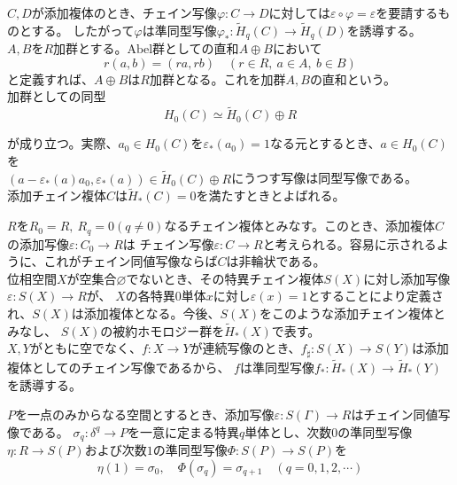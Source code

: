 \documentclass[dvipdfmx,a4paper,11pt]{jsarticle}
\begin{document}
$C,D$が添加複体のとき、チェイン写像$\varphi : C\to D$に対しては$\varepsilon \circ \varphi = \varepsilon$を要請するものとする。
したがって$\varphi$は準同型写像$\varphi_{*} : \widetilde{H}_{q}(C)\to \widetilde{H}_{q}(D)$を誘導する。\\
$A,B$を$R$加群とする。$\mathrm{Abel}$群としての直和$A\oplus B$において
\begin{equation*}
  r(a,b)=(ra,rb)\quad (r\in R,\ a\in A,\ b\in B)
\end{equation*}
と定義すれば、$A\oplus B$は$R$加群となる。これを加群$A,B$の直和という。\\
加群としての同型
\begin{equation*}
  H_{0}(C)\simeq \widetilde{H}_{0}(C)\oplus R
\end{equation*}

が成り立つ。実際、$a_{0}\in H_{0}(C)$を$\varepsilon_{*}(a_{0})=1$なる元とするとき、$a\in H_{0}(C)$を\\
$(a-\varepsilon_{*}(a)a_{0},\varepsilon_{*}(a))\in \widetilde{H}_{0}(C)\oplus R$にうつす写像は同型写像である。\\
添加チェイン複体$C$は$\widetilde{H}_{*}(C)=0$を満たすときとよばれる。

\clearpage

$R$を$R_{0}=R,\ R_{q}=0(q\neq 0)$なるチェイン複体とみなす。このとき、添加複体$C$の添加写像$\varepsilon : C_{0}\to R$は
チェイン写像$\varepsilon : C\to R$と考えられる。容易に示されるように、これがチェイン同値写像ならば$C$は非輪状である。\\
位相空間$X$が空集合$\varnothing$でないとき、その特異チェイン複体$S(X)$に対し添加写像$\varepsilon : S(X)\to R$が、
$X$の各特異$0$単体$x$に対し$\varepsilon(x)=1$とすることにより定義され、$S(X)$は添加複体となる。今後、$S(X)$をこのような添加チェイン複体とみなし、
$S(X)$の被約ホモロジー群を$\widetilde{H}_{*}(X)$で表す。\\
$X,Y$がともに空でなく、$f:X\to Y$が連続写像のとき、$f_{\sharp}:S(X)\to S(Y)$は添加複体としてのチェイン写像であるから、
$f$は準同型写像$f_{*}:\widetilde{H}_{*}(X)\to \widetilde{H}_{*}(Y)$を誘導する。
\begin{tcolorbox}[title = 補題2,upperbox = visible]
  $P$を一点のみからなる空間とするとき、添加写像$\varepsilon : S(\Gamma)\to R$はチェイン同値写像である。
  \tcblower
  $\sigma_{q}:\delta^{q}\to P$を一意に定まる特異$q$単体とし、次数$0$の準同型写像$\eta : R\to S(P)$および次数$1$の準同型写像$\Phi : S(P)\to S(P)$を
  \begin{equation*}
    \eta(1)=\sigma_{0},\quad \Phi(\sigma_{q})=\sigma_{q+1}\quad (q=0,1,2,\cdots)
  \end{equation*}

\end{tcolorbox}
\end{document}
